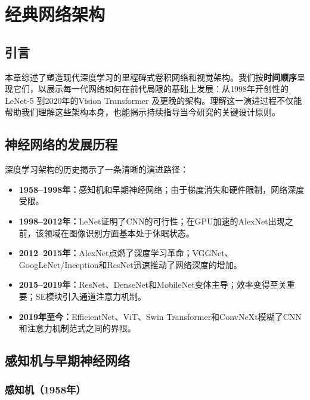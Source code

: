 \clearpage
\cleardoublepage

\chapter{经典网络架构}

\section{引言}

本章综述了塑造现代深度学习的里程碑式卷积网络和视觉架构。我们按\textbf{时间顺序}呈现它们，以展示每一代网络如何在前代局限的基础上发展：从1998年开创性的LeNet-5 \cite{lecun1998gradient}到2020年的Vision Transformer \cite{dosovitskiy2020image}及更晚的架构。理解这一演进过程不仅能帮助我们理解这些架构本身，也能揭示持续指导当今研究的关键设计原则。

\section{神经网络的发展历程}

深度学习架构的历史揭示了一条清晰的演进路径：
\begin{itemize}
    \item \textbf{1958--1998年：}感知机和早期神经网络；由于梯度消失和硬件限制，网络深度受限。
    \item \textbf{1998--2012年：}LeNet证明了CNN的可行性；在GPU加速的AlexNet出现之前，该领域在图像识别方面基本处于休眠状态。
    \item \textbf{2012--2015年：}AlexNet点燃了深度学习革命；VGGNet、GoogLeNet/Inception和ResNet迅速推动了网络深度的增加。
    \item \textbf{2015--2019年：}ResNet、DenseNet和MobileNet变体主导；效率变得至关重要；SE模块引入通道注意力机制。
    \item \textbf{2019年至今：}EfficientNet、ViT、Swin Transformer和ConvNeXt模糊了CNN和注意力机制范式之间的界限。
\end{itemize}

\section{感知机与早期神经网络}

\subsection{感知机（1958年）}


